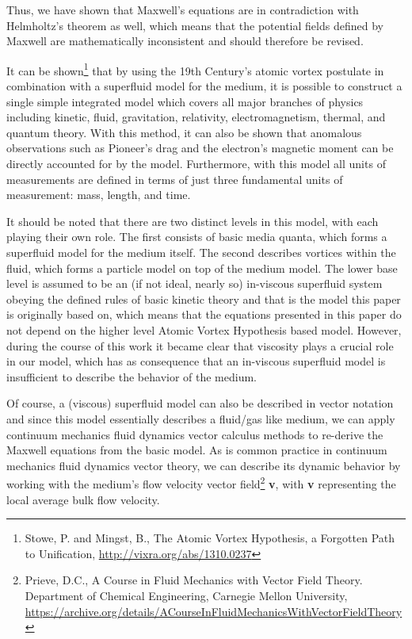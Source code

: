 \documentclass[a4paper]{article}
\newcommand\textstyleNone[1]{#1}
\begin{document}
{
\textstyleNone{{Thus, we have shown that Maxwell's equations are in
contradiction with Helmholtz's theorem as well, which means that the potential fields defined by Maxwell are
mathematically inconsistent and should therefore be revised.}}}

{
\textstyleNone{{It can be shown}}\footnote{\textstyleNone{ Stowe, P.
and Mingst, B., The Atomic Vortex Hypothesis, a Forgotten Path to Unification,
}\url{http://vixra.org/abs/1310.0237}\textstyleNone{ }\par
}\textstyleNone{{ that by using the 19th Century's atomic vortex
postulate in combination with a superfluid model for the medium, it is possible to construct a single simple integrated
model which covers all major branches of physics including kinetic, fluid, gravitation, relativity, electromagnetism,
thermal, and quantum theory. With this method, it can also be shown that anomalous observations such as Pioneer's drag
and the electron's magnetic moment can be directly accounted for by the model. Furthermore, with this model all units
of measurements are defined in terms of just three fundamental units of measurement: mass, length, and time.}} }

{
It should be noted that there are two distinct levels in this model, with each playing their own role. The first
consists of basic media quanta, which forms a superfluid model for the medium itself. The second describes vortices
within the fluid, which forms a particle model on top of the medium model. The lower base level is assumed to be an (if
not ideal, nearly so) in-viscous superfluid system obeying the defined rules of basic kinetic theory and that is the
model this paper is originally based on, which means that the equations presented in this paper do not depend on the
higher level Atomic Vortex Hypothesis based model. However, during the course of this work it became clear that
viscosity plays a crucial role in our model, which has as consequence that an in-viscous superfluid model is
insufficient to describe the behavior of the medium.}

{
\textstyleNone{{Of course,
}{a}{
}{(viscous)
}{superfluid model can also be described in vector notation and
since this model essentially describes a fluid/gas like medium, we can apply continuum mechanics fluid dynamics vector
calculus methods to re-derive the Maxwell equations from the basic model. As is common practice in continuum mechanics
fluid dynamics vector theory, we can describe its dynamic behavior by working with the medium's flow velocity vector
field}}\footnote{\textstyleNone{ Prieve, D.C., A Course in Fluid Mechanics with Vector Field Theory. Department of
Chemical Engineering, Carnegie Mellon University,
}\url{https://archive.org/details/ACourseInFluidMechanicsWithVectorFieldTheory}\par
}\textstyleNone{{
}\textbf{{v}}{,
with
}\textbf{{v}}{
representing the local average bulk flow velocity. }}}
\end{document}
